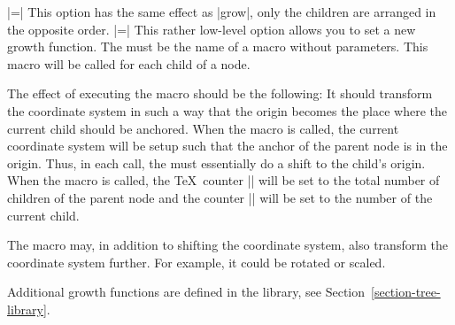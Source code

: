 \begin{itemize}
\begin{codeexample}[]
\end{codeexample}

\begin{codeexample}[]
\end{codeexample}

  |=|
  This option has the same effect as |grow|, only the children are
  arranged in the opposite order.
  |=|
  This rather low-level option allows you to set a new growth
  function. The  must be the name of a macro without
  parameters. This macro will be called for each child of a node.

  The effect of executing the macro should be the following: It should
  transform the coordinate system in such a way that the origin
  becomes the place where the current child should be anchored. When
  the macro is called, the current coordinate system will be setup
  such that the anchor of the parent node is in the origin. Thus, in
  each call, the  must essentially do a shift to the
  child's origin. When the macro is called, the \TeX\ counter
  |\tikznumberofchildren| will be set to the total number of children
  of the parent node and the counter |\tikznumberofcurrentchild| will
  be set to the number of the current child.

  The macro may, in addition to shifting the coordinate system, also
  transform the coordinate system further. For example, it could be
  rotated or scaled.

  Additional growth functions are defined in the library, see 
  Section~\ref{section-tree-library}.
\end{itemize}



